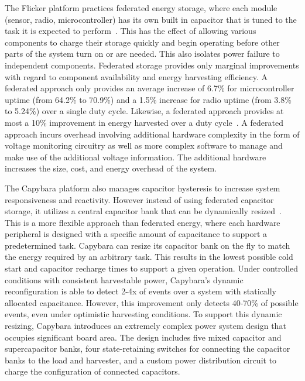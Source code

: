 The Flicker
platform practices federated energy storage, where each module (sensor, radio, microcontroller) has its own built in capacitor that is tuned to the task it is expected to perform~\cite{hesterFlicker17, hesterTragedy15}. 
This has the
effect of allowing various components to charge their storage quickly and begin operating before other parts of the system turn on or are needed. This also
isolates power failure to independent components.
Federated storage provides only marginal improvements with regard to component availability and energy harvesting efficiency. A federated approach only provides an average increase of 6.7\% for microcontroller uptime (from 64.2\% to 70.9\%) and a 1.5\% increase for radio uptime (from 3.8\% to 5.24\%) over a single duty cycle. Likewise, a federated approach provides at most a 10\% improvement in energy harvested over a duty cycle~\cite{hesterTragedy15}.
A federated approach incurs overhead involving additional hardware complexity in the form of voltage monitoring circuitry as well as more complex software to manage and make use of the additional voltage information. The additional hardware increases the size, cost, and energy overhead of the system.

The Capybara platform also manages capacitor hysteresis to increase system responsiveness and reactivity. However instead of using federated capacitor storage, it utilizes a central capacitor bank that can be dynamically resized~\cite{colinReconfigurable18}.
This is a more flexible approach than federated energy, where each hardware peripheral is designed with a specific amount of capacitance to support a predetermined task.
Capybara can resize its capacitor bank on the fly to match the energy required by an arbitrary task. This results in the lowest possible cold start and capacitor recharge times to support a given operation.
Under controlled conditions with consistent harvestable power, Capybara's dynamic reconfiguration is able to detect 2-4x of events over a system with statically allocated capacitance. However, this improvement only detects 40-70\% of possible events, even under optimistic harvesting conditions.
To support this dynamic resizing, Capybara introduces an extremely complex power system design that occupies significant board area. The design includes five mixed capacitor and supercapacitor banks, four state-retaining switches for connecting the capacitor banks to the load and harvester, and a custom power distribution circuit to charge the configuration of connected capacitors.

